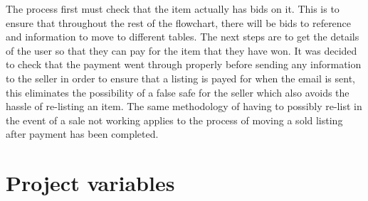 The process first must check that the item actually has bids on it. This is to ensure that throughout the rest of the flowchart, there will be bids to reference and information to move to different tables. The next steps are to get the details of the user so that they can pay for the item that they have won. It was decided to check that the payment went through properly before sending any information to the seller in order to ensure that a listing is payed for when the email is sent, this eliminates the possibility of a false safe for the seller which also avoids the hassle of re-listing an item. The same methodology of having to possibly re-list in the event of a sale not working applies to the process of moving a sold listing after payment has been completed. 

\section{Project variables}
